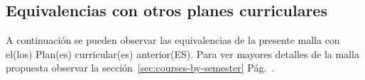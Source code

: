 \begin{landscape}
\chapter{Equivalencias con otros planes curriculares}\label{chap:equivalence}
A continuación se pueden observar las equivalencias de la presente malla con el(los) Plan(es) curricular(es) anterior(ES). 
Para ver mayores detalles de la malla propuesta observar la sección~\ref{sec:courses-by-semester} Pág.~\pageref{sec:courses-by-semester}.


\end{landscape}

